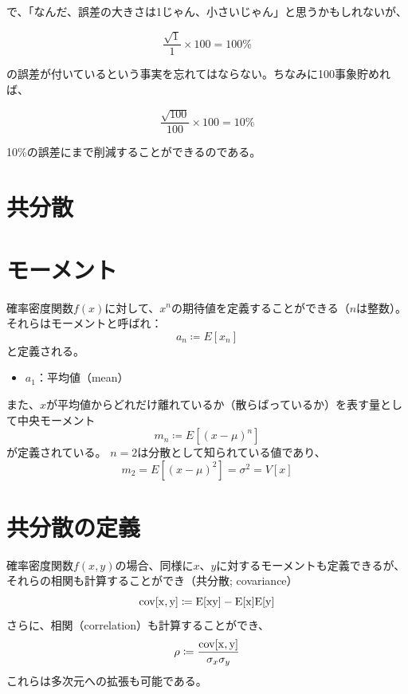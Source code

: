 で、「なんだ、誤差の大きさは1じゃん、小さいじゃん」と思うかもしれないが、

\begin{equation}
  \frac{\sqrt{1}}{1}\times 100 = 100 \%
\end{equation}

の誤差が付いているという事実を忘れてはならない。ちなみに100事象貯めれば、

\begin{equation}
  \frac{\sqrt{100}}{100}\times 100 = 10 \%
\end{equation}

10\%の誤差にまで削減することができるのである。

\section{共分散}

\section{モーメント}
確率密度関数$f(x)$に対して、$x^n$の期待値を定義することができる（$n$は整数）。
それらはモーメントと呼ばれ：
\begin{equation}
  a_n \coloneqq E[x_n]
\end{equation}
と定義される。
\begin{itemize}
  \item $a_1$：平均値（mean）
\end{itemize}

また、$x$が平均値からどれだけ離れているか（散らばっているか）を表す量として中央モーメント
\begin{equation}
  m_n \coloneqq E[(x-\mu)^n]
\end{equation}
が定義されている。
$n=2$は分散として知られている値であり、
\begin{equation}
  m_2 = E[(x-\mu)^2] = \sigma^2 = V[x]
\end{equation}


\section{共分散の定義}

確率密度関数$f(x,y)$の場合、同様に$x$、$y$に対するモーメントも定義できるが、それらの相関も計算することができ（共分散; covariance）
\begin{equation}
  \rm{cov}[x,y] \coloneqq E[xy] - E[x]E[y]
\end{equation}
さらに、相関（correlation）も計算することができ、
\begin{equation}
  \rho \coloneqq \frac{\rm{cov}[x,y]}{\sigma_x\sigma_y}
\end{equation}
これらは多次元への拡張も可能である。
